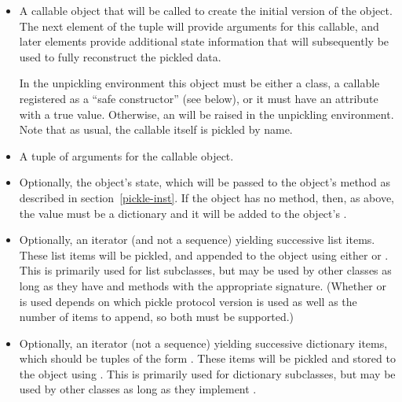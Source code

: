 \begin{itemize}

\item A callable object that will be called to create the initial
version of the object.  The next element of the tuple will provide
arguments for this callable, and later elements provide additional
state information that will subsequently be used to fully reconstruct
the pickled data.

In the unpickling environment this object must be either a class, a
callable registered as a ``safe constructor'' (see below), or it must
have an attribute  with a true value.
Otherwise, an  will be raised in the
unpickling environment.  Note that as usual, the callable itself is
pickled by name.

\item A tuple of arguments for the callable object.

\item Optionally, the object's state, which will be passed to
      the object's  method as described in
      section~\ref{pickle-inst}.  If the object has no
       method, then, as above, the value must
      be a dictionary and it will be added to the object's
      .

\item Optionally, an iterator (and not a sequence) yielding successive
list items.  These list items will be pickled, and appended to the
object using either  or
.  This is primarily used for
list subclasses, but may be used by other classes as long as they have
 and  methods with the appropriate
signature.  (Whether  or  is used
depends on which pickle protocol version is used as well as the number
of items to append, so both must be supported.)

\item Optionally, an iterator (not a sequence)
yielding successive dictionary items, which should be tuples of the
form .  These items will be pickled
and stored to the object using .
This is primarily used for dictionary subclasses, but may be used by
other classes as long as they implement .

\end{itemize}

